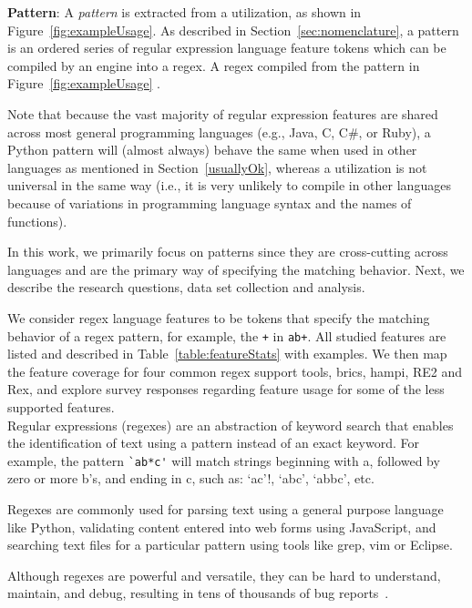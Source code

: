 \noindent \textbf{Pattern}: A \emph{pattern} is extracted from a utilization, as shown in Figure~\ref{fig:exampleUsage}. As described in Section~\ref{sec:nomenclature}, a pattern is an ordered series of regular expression language feature tokens which can be compiled by an engine into a regex.  A regex compiled from the pattern in Figure~\ref{fig:exampleUsage} .

Note that because the vast majority of regular expression features are shared across most general programming languages (e.g., Java, C, C\#, or Ruby), a Python pattern will (almost always) behave the same when used in other languages as mentioned in Section~\ref{usuallyOk}, whereas a utilization is not universal in the same way (i.e., it is very unlikely to compile in other languages because of variations in programming language syntax and the names of functions).






In this work, we primarily focus on patterns since they are cross-cutting across languages and are the primary way of specifying the matching behavior. Next, we describe the research questions, data set collection and analysis.

We consider regex language features to be tokens that specify the matching behavior of a regex pattern, for example,  the {\tt +} in {\tt ab+}.  All studied features are listed and described in Table~\ref{table:featureStats} with examples. We then map the feature coverage for four common regex support tools, brics, hampi, RE2 and Rex, and explore survey responses regarding feature usage for some of the less supported features.\\

Regular expressions (regexes) are an abstraction of keyword search that enables the identification of text using a pattern instead of an exact keyword.  For example, the pattern \verb!`ab*c'! will match strings beginning with a, followed by zero or more b's, and ending in c, such as: `ac'!, `abc', `abbc', etc.

Regexes are commonly used for parsing text using a general purpose language like Python, validating content entered into web forms using JavaScript, and searching text files for a particular pattern using tools like grep, vim or Eclipse.

Although regexes are powerful and versatile, they can be hard to understand,  maintain, and debug, resulting in tens of thousands of bug reports~\cite{Spishak:2012:TSR:2318202.2318207}.

